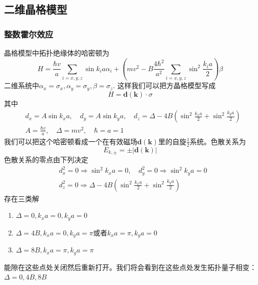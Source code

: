 \documentclass{article}
\numberwithin{equation}{subsection}
\begin{document}
\subsection{二维晶格模型}
\subsubsection{整数霍尔效应}
晶格模型中拓扑绝缘体的哈密顿为
\begin{equation}
    H=\frac{\hbar v}{a} \sum_{i=x, y, z} \sin k_{i} a \alpha_{i}+\left(m v^{2}-B \frac{4 \hbar^{2}}{a^{2}} \sum_{i=x, y, z} \sin ^{2} \frac{k_{i} a}{2}\right) \beta
\end{equation}
二维系统中$\alpha_x=\sigma_x,\alpha_y=\sigma_y,\beta=\sigma_z$. 这样我们可以把方晶格模型写成
\begin{equation}
    H=\mathbf{d}(\mathbf{k})\cdot\sigma
\end{equation}
其中
\begin{equation}
    \begin{split}
        &d_x=A\sin k_xa,\quad d_y=A\sin k_ya,\quad d_z=\Delta-4B(\sin^2\frac{k_xa}{2}+\sin^2\frac{k_ya}{2})\\
        &A=\frac{\hbar v}{a},\quad\Delta=mv^2,\quad\hbar=a=1
    \end{split}
\end{equation}
我们可以把这个哈密顿看成一个在有效磁场$\mathbf{d}(\mathbf{k})$里的自旋$\frac{1}{2}$系统。色散关系为
\begin{equation}
    E_{k,\pm}=\pm|\mathbf{d}(\mathbf{k})|
\end{equation}
色散关系的零点由下列决定
\begin{equation}
    \begin{split}
        &d_x^2=0\Longrightarrow\sin^2 k_xa=0,\quad d_y^2=0\Longrightarrow\sin^2k_ya=0\\
        &d_z^2=0\Longrightarrow\Delta-4B(\sin^2\frac{k_xa}{2}+\sin^2\frac{k_ya}{2})
    \end{split}
\end{equation}
存在三类解
\begin{enumerate}
    \item $\Delta=0,k_xa=0,k_ya=0$
    \item $\Delta=4B,k_xa=0,k_ya=\pi$或者$k_xa=\pi,k_ya=0$
    \item $\Delta=8B,k_xa=\pi,k_ya=\pi$
\end{enumerate}
能隙在这些点处关闭然后重新打开。我们将会看到在这些点处发生拓扑量子相变：$\Delta=0,4B,8B$
\end{document}
